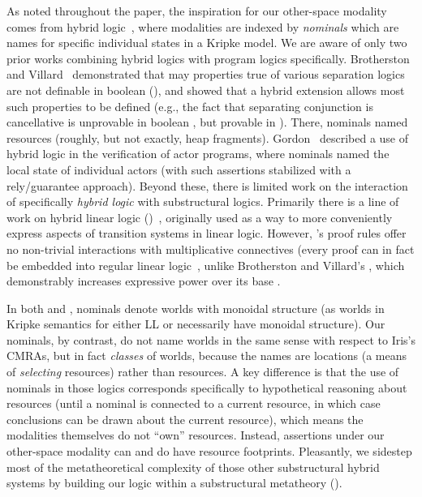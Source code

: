 As noted throughout the paper, the inspiration for our other-space modality comes from hybrid logic~\cite{areces2001hybrid,blackburn1995hybrid,gargov1993modal,goranko1996hierarchies},
where modalities are indexed by \emph{nominals} which are names for specific individual states in a Kripke model.
We are aware of only two prior works combining hybrid logics with program logics specifically. 
Brotherston and Villard~\cite{brotherston2014parametric} demonstrated that may properties true of various 
separation logics are not definable in boolean \BI (\BBI), and showed that a hybrid extension \HyBBI allows
most such properties to be defined (e.g., the fact that separating conjunction is cancellative is unprovable 
in boolean \BI, but provable in \HyBBI). There, nominals named resources 
(roughly, but not exactly, heap fragments). 
Gordon~\cite{gordon2019modal} described a use of hybrid logic in the verification of actor programs, 
where nominals named the local state of individual actors (with such assertions stabilized with a 
rely/guarantee approach). Beyond these, there is limited work on the interaction of specifically 
\emph{hybrid logic} with substructural logics. 
Primarily there is a line of work on hybrid linear logic (\HyLL)~\cite{despeyroux2014hybrid}, 
originally used as a way to more conveniently express aspects of transition systems in linear logic. 
However, \HyLL's proof rules offer no non-trivial interactions with multiplicative connectives 
(every \HyLL proof can in fact be embedded into regular linear logic~\cite{chaudhuri2019hybrid}, 
unlike Brotherston and Villard's \HyBBI, which demonstrably increases expressive power over its base \BBI.

In both \HyLL and \HyBBI, nominals denote worlds with monoidal structure (as worlds in Kripke semantics
for either LL or \BBI necessarily have monoidal structure). Our nominals, by contrast, 
do not name worlds in the same sense with respect to Iris's CMRAs, 
but in fact \emph{classes} of worlds, because the names are locations 
(a means of \emph{selecting} resources) rather than resources.  
A key difference is that the use of nominals in those logics corresponds specifically to hypothetical 
reasoning about resources (until a nominal is connected to a current resource, in which case conclusions 
can be drawn about the current resource), which means the modalities themselves do not ``own'' resources. 
Instead, assertions under our other-space modality can and do
have resource footprints.
Pleasantly, we sidestep most of the metatheoretical complexity of those other substructural hybrid
systems by building our logic within a substructural metatheory (\iris).

